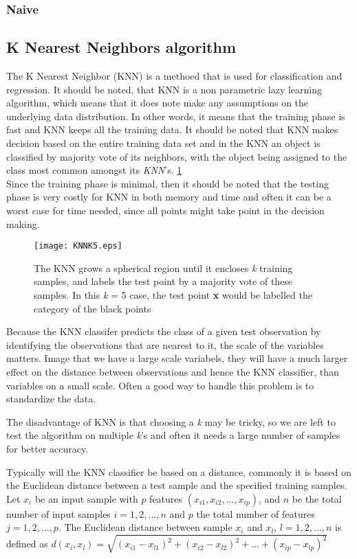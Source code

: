 \subsubsection{Naive}

\subsection{K Nearest Neighbors algorithm}

The K Nearest Neighbor (KNN) is a methoed that is used for classification and regression. It should be noted, that KNN is a non parametric lazy learning algorithm, which means that it does note make any assumptions on the underlying data distribution. In other words, it means that the training phase is fast and KNN keeps all the training data. It should be noted that KNN makes decision based on the entire training data set and in the KNN an object is classified by majority vote of its neighbors, with the object being assigned to the class most common amongst its \textit{KNN}'s. \ref{fig:KNNK5}\\
Since the training phase is minimal, then it should be noted that the testing phase is very costly for KNN in both memory and time and often it can be a worst case for time needed, since all points might take point in the decision making.

\begin{figure}[H]
  \centering
  \texttt{[image: KNNK5.eps]}
  \caption{The KNN grows a spherical region until it encloses \textit{k} training samples, and labels the test point by a majority vote of these samples. In this \textit{k} = 5 case, the test point \textbf{x} would be labelled the category of the black points}\label{fig:KNNK5}
\end{figure}

Because the KNN classifer predicts the class of a given test observation by identifying the observations that are nearest to it, the scale of the variables matters. Image that we have a large scale variabels, they will have a much larger effect on the distance between observations and hence the KNN classifier, than variables on a small scale. Often a good way to handle this problem is to standardize the data.

The disadvantage of KNN is that choosing a \textit{k} may be tricky, so we are left to test the algorithm on multiple \textit{k}'s and often it needs a large number of samples for better accuracy.

Typically will the KNN classifier be based on a distance, commonly it is based on the Euclidean distance between a test sample and the specified training samples. Let $x_i$ be an input sample with $p$ features $(x_{i1}, x_{i2},...,x_{ip})$, and $n$ be the total number of input samples $i=1,2,...,n$ and $p$ the total number of features $j=1,2,...,p$. The Euclidean distance between sample $x_i$ and $x_l$, $l=1,2,...,n$ is defined as $d(x_i,x_l) = \sqrt{(x_{i1}-x_{l1})^2+(x_{i2}-x_{l2})^2+...+(x_{ip}-x_{lp})^2}$

